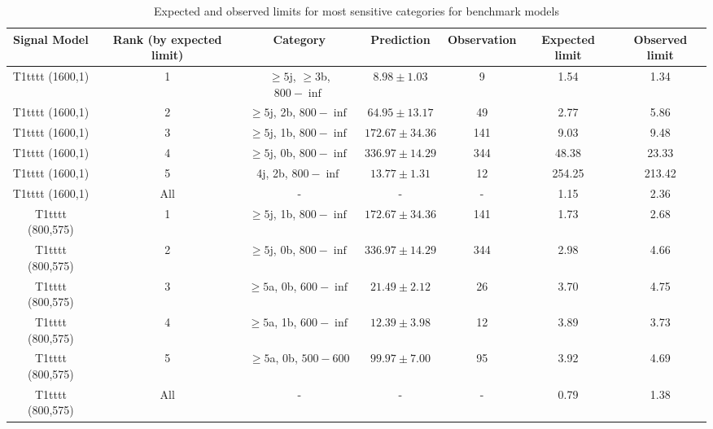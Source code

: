 \begin{landscape}
\begin{longtable}{ccccccc}
\caption{Expected and observed limits for most sensitive categories for benchmark models} \label{tab:benchMarkTable_T1tttt} \\    \hline
Signal Model & Rank (by expected limit) & Category & Prediction & Observation & Expected limit & Observed limit\\ \hline
T1tttt (1600,1) & 1 & $\ge5$j, $\ge3$b, $800-\inf$ & $8.98 \pm 1.03$ & 9 & 1.54 & 1.34\\ 
T1tttt (1600,1) & 2 & $\ge5$j, 2b, $800-\inf$ & $64.95 \pm 13.17$ & 49 & 2.77 & 5.86\\ 
T1tttt (1600,1) & 3 & $\ge5$j, 1b, $800-\inf$ & $172.67 \pm 34.36$ & 141 & 9.03 & 9.48\\ 
T1tttt (1600,1) & 4 & $\ge5$j, 0b, $800-\inf$ & $336.97 \pm 14.29$ & 344 & 48.38 & 23.33\\ 
T1tttt (1600,1) & 5 & 4j, 2b, $800-\inf$ & $13.77 \pm 1.31$ & 12 & 254.25 & 213.42\\ 
T1tttt (1600,1) & All & - & - & - & 1.15 & 2.36\\ 
T1tttt (800,575) & 1 & $\ge5$j, 1b, $800-\inf$ & $172.67 \pm 34.36$ & 141 & 1.73 & 2.68\\ 
T1tttt (800,575) & 2 & $\ge5$j, 0b, $800-\inf$ & $336.97 \pm 14.29$ & 344 & 2.98 & 4.66\\ 
T1tttt (800,575) & 3 & $\ge5$a, 0b, $600-\inf$ & $21.49 \pm 2.12$ & 26 & 3.70 & 4.75\\ 
T1tttt (800,575) & 4 & $\ge5$a, 1b, $600-\inf$ & $12.39 \pm 3.98$ & 12 & 3.89 & 3.73\\ 
T1tttt (800,575) & 5 & $\ge5$a, 0b, $500-600$ & $99.97 \pm 7.00$ & 95 & 3.92 & 4.69\\ 
T1tttt (800,575) & All & - & - & - & 0.79 & 1.38\\ 
\hline
\hline
\end{longtable}
\end{landscape}
